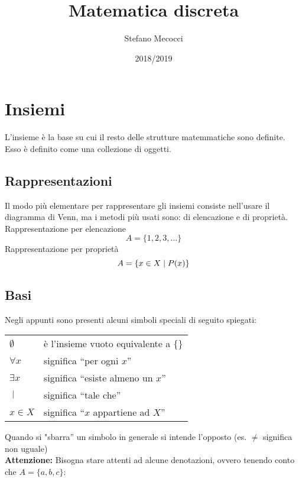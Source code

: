 \documentclass[12pt,a4paper]{article}
\title{Matematica discreta}
\author{Stefano Mecocci}
\date{2018/2019}
\newcommand{\Setsuchthat}{\;\ifnum\currentgrouptype=16 \middle\fi|\;} %
\begin{document}
  \maketitle
  \thispagestyle{empty}

  \newpage
  \tableofcontents
  \newpage

  \section{Insiemi}
  L'insieme è la base su cui il resto delle strutture matemmatiche sono definite. Esso è definito come una collezione di oggetti.

  \subsection{Rappresentazioni}
  Il modo più elementare per rappresentare gli insiemi consiste nell'usare il diagramma di Venn, ma i metodi più usati sono: di elencazione e di proprietà.
Rappresentazione per elencazione
  \begin{equation}
    A = \{1, 2, 3, \ldots\}
  \end{equation}
Rappresentazione per proprietà
  \begin{equation}
    A = \{x \in X \Setsuchthat P(x)\}
  \end{equation}

  \subsection{Basi}
  Negli appunti sono presenti alcuni simboli speciali di seguito spiegati:
  \begin{center}
    \begin{tabular}{p{2cm}p{10cm}}
      $ \emptyset $ & è l'insieme vuoto equivalente a $ \{\} $\\
      $ \forall x $ & significa ``per ogni $x$''\\
      $ \exists x $ & significa ``esiste almeno un $x$''\\
      $ \Setsuchthat $ & significa ``tale che''\\
      $ x \in X $ & significa ``$x$ appartiene ad $X$''\\
    \end{tabular}
  \end{center}
  Quando si "sbarra'' un simbolo in generale si intende l'opposto (es. $ \neq $ significa
  non uguale)\\[\baselineskip]
  \textbf{Attenzione:} Bisogna stare attenti ad alcune denotazioni, ovvero tenendo conto che $ A = \{a, b, c\} $:
\end{document}

